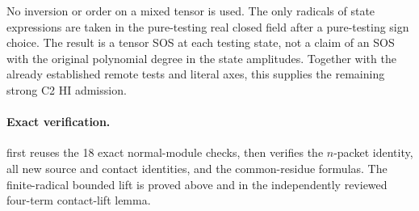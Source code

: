 No inversion or order on a mixed tensor is used. The only radicals of
state expressions are taken in the pure-testing real closed field after
a pure-testing sign choice. The result is a tensor SOS at each testing
state, not a claim of an SOS with the original polynomial degree in the
state amplitudes. Together with the already established remote tests
and literal axes, this supplies the remaining strong C2 HI admission.

\paragraph{Exact verification.}
 first reuses the 18 exact
normal-module checks, then verifies the $n$-packet identity, all new
source and contact identities, and the common-residue formulas. The
finite-radical bounded lift is proved above and in the independently
reviewed four-term contact-lift lemma.
